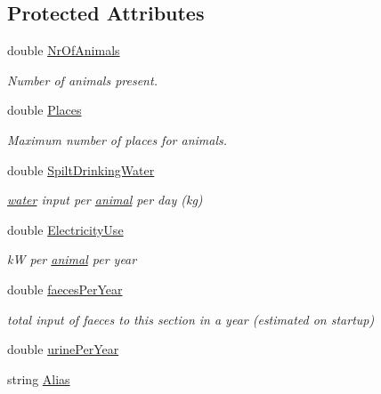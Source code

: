 \subsection*{Protected Attributes}
\begin{DoxyCompactItemize}
\item 
double \hyperlink{classanimal_section_a1911235adfd2f409e78b671cf8df0c8a}{NrOfAnimals}
\begin{DoxyCompactList}\small\item\em Number of animals present. \item\end{DoxyCompactList}\item 
double \hyperlink{classanimal_section_a6dec38054e731fa71041f934f12897b7}{Places}
\begin{DoxyCompactList}\small\item\em Maximum number of places for animals. \item\end{DoxyCompactList}\item 
double \hyperlink{classanimal_section_ab89ee53e426cd797b752f65669b2bde2}{SpiltDrinkingWater}
\begin{DoxyCompactList}\small\item\em \hyperlink{classwater}{water} input per \hyperlink{classanimal}{animal} per day (kg) \item\end{DoxyCompactList}\item 
double \hyperlink{classanimal_section_a0af16539b92229327a050cce9372f4cc}{ElectricityUse}
\begin{DoxyCompactList}\small\item\em kW per \hyperlink{classanimal}{animal} per year \item\end{DoxyCompactList}\item 
double \hyperlink{classanimal_section_ab764a9e7261c89469543c202df1aff2a}{faecesPerYear}
\begin{DoxyCompactList}\small\item\em total input of faeces to this section in a year (estimated on startup) \item\end{DoxyCompactList}\item 
double \hyperlink{classanimal_section_ae3f2a70dd57961b9b98842622b6ebcd2}{urinePerYear}
\item 
string \hyperlink{classanimal_section_ae78e07631b9b3eec8795a89357456417}{Alias}
\item 

\end{DoxyCompactItemize}
